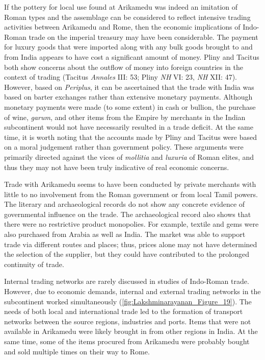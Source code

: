 If the pottery for local use found at Arikamedu was indeed an imitation of Roman types and the assemblage can be considered to reflect intensive trading activities between Arikamedu and Rome, then the economic implications of Indo-Roman trade on the imperial treasury may have been considerable. The payment for luxury goods that were imported along with any bulk goods brought to and from India appears to have cost a significant amount of money. Pliny and Tacitus both show concerns about the outflow of money into foreign countries in the context of trading (Tacitus \emph{Annales} III: 53; Pliny \emph{NH} VI: 23, \emph{NH} XII: 47). However, based on \emph{Periplus}, it can be ascertained that the trade with India was based on barter exchanges rather than extensive monetary payments. Although monetary payments were made (to some extent) in cash or bullion, the purchase of wine, \emph{garum}, and other items from the Empire by merchants in the Indian subcontinent would not have necessarily resulted in a trade deficit. At the same time, it is worth noting that the accounts made by Pliny and Tacitus were based on a moral judgement rather than government policy. These arguments were primarily directed against the vices of \emph{mollitia} and \emph{luxuria} of Roman elites, and thus they may not have been truly indicative of real economic concerns.

Trade with Arikamedu seems to have been conducted by private merchants with little to no involvement from the Roman government or from local Tamil powers. The literary and archaeological records do not show any concrete evidence of governmental influence on the trade. The archaeological record also shows that there were no restrictive product monopolies. For example, textile and gems were also purchased from Arabia as well as India. The market was able to support trade via different routes and places; thus, prices alone may not have determined the selection of the supplier, but they could have contributed to the prolonged continuity of trade.


Internal trading networks are rarely discussed in studies of Indo-Roman trade. However, due to economic demands, internal and external trading networks in the subcontinent worked simultaneously (\cref{fig:Lakshminarayanan_Figure_19}). The needs of both local and international trade led to the formation of transport networks between the source regions, industries and ports. Items that were not available in Arikamedu were likely brought in from other regions in India. At the same time, some of the items procured from Arikamedu were probably bought and sold multiple times on their way to Rome.

